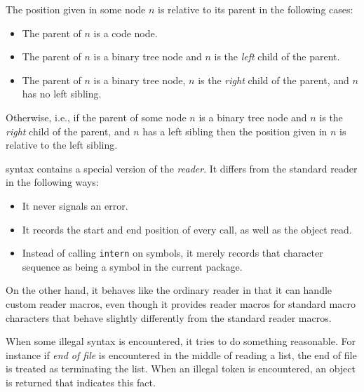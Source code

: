 The position given in some node $n$ is relative to its parent in the
following cases:

\begin{itemize}
\item The parent of $n$ is a code node.
\item The parent of $n$ is a binary tree node and $n$ is the
  \emph{left} child of the parent.
\item The parent of $n$ is a binary tree node, $n$ is the
  \emph{right} child of the parent, and $n$ has no left sibling.
\end{itemize}

Otherwise, i.e., if the parent of some node $n$ is a binary tree node
and $n$ is the \emph{right} child of the parent, and $n$ has a left
sibling then the position given in $n$ is relative to the left
sibling.

\commonlisp{} syntax contains a special version of the \commonlisp{}
\emph{reader}.  It differs from the standard reader in the following
ways:

\begin{itemize}
\item It never signals an error.
\item It records the start and end position of every call, as well as
  the object read.
\item Instead of calling \texttt{intern} on symbols, it merely records
  that character sequence as being a symbol in the current package. 
\end{itemize}

On the other hand, it behaves like the ordinary \commonlisp{} reader
in that it can handle custom reader macros, even though it provides
reader macros for standard macro characters that behave slightly
differently from the standard reader macros.

When some illegal syntax is encountered, it tries to do something
reasonable.  For instance if \emph{end of file} is encountered in the
middle of reading a list, the end of file is treated as terminating
the list.  When an illegal token is encountered, an object is returned
that indicates this fact. 


